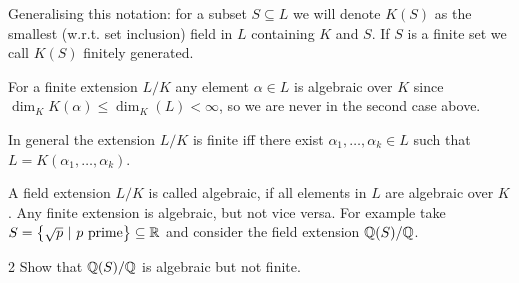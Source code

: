 \documentclass[twoside = false,	%
		headsepline,		%
		parskip = true,
		]{scrbook}						%
\begin{document}
        Generalising this notation: for a subset $S \subseteq L$ we will denote $K(S)$ as the smallest (w.r.t. set inclusion) field in $L$ containing $K$ and $S$. If $S$ is a finite set we call $K(S)$ finitely generated.
        
        For a finite extension $L/K$ any element $\alpha \in L$ is algebraic over $K$ since $\dim_K K(\alpha) \leq \dim_K(L) < \infty$, so we are never in the second case above.
        
        In general the extension $L/K$ is finite iff there exist $\alpha_1,\dots,\alpha_k \in L$ such that $L = K(\alpha_1,\dots,\alpha_k)$.
        
        A field extension $L/K$ is called algebraic, if all elements in $L$ are algebraic over $K$. Any finite extension is algebraic, but not vice versa. For example take $S = \left\{\sqrt{p} \ | \ p \text{ prime} \right\} \subseteq \mathbb R$ and consider the field extension $\mathbb Q(S)/\mathbb Q$.
        
        \begin{exercise}{}{2}
            Show that $\mathbb Q(S)/\mathbb Q$ is algebraic but not finite.
        \end{exercise}
        
\end{document}
